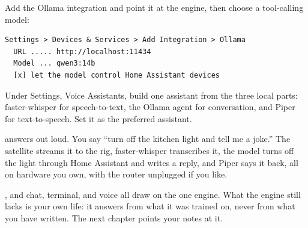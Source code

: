 
 Add the Ollama integration and point it at
the engine, then choose a tool-calling model:

\begin{verbatim}
Settings > Devices & Services > Add Integration > Ollama
  URL ..... http://localhost:11434
  Model ... qwen3:14b
  [x] let the model control Home Assistant devices
\end{verbatim}

 Under Settings, Voice Assistants, build one
assistant from the three local parts: faster-whisper for speech-to-text, the Ollama
agent for conversation, and Piper for text-to-speech. Set it as the preferred
assistant.


 answers out loud. You say ``turn off the kitchen light
and tell me a joke.''
The satellite streams it to the rig, faster-whisper transcribes it, the model turns
off the light through Home Assistant and writes a reply, and Piper says it back, all
on hardware you own, with the router unplugged if you like.


, and chat, terminal, and voice all
draw on the one engine. What the engine still lacks is your own life: it answers
from what it was trained on, never from what you have written. The next chapter
points your notes at it.

